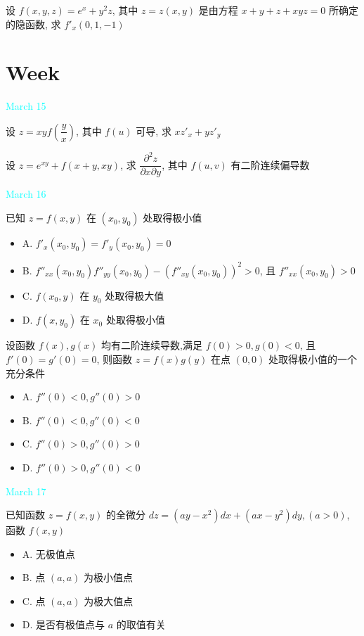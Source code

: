 \begin{example}[][Exam: 29.2.14]
	设 $f(x,y,z)=e^{x}+y^{2}z$, 其中 $z=z(x,y)$ 是由方程 $x+y+z+xyz=0$ 所确定的隐函数, 求 $f'_{x}(0,1,-1)$
\end{example}
\section{Week }
\textcolor{cyan}{March 15}

\begin{example}[][Exam: 29.3.1]
	设 $z=xyf(\dfrac{y}{x})$, 其中 $f(u)$ 可导, 求 $xz'_{x}+yz'_{y}$
\end{example}

\begin{example}[][Exam: 29.3.2]
	设 $z=e^{xy}+f(x+y,xy)$, 求 $\dfrac{\partial^{2} z}{\partial x\partial y}$, 其中 $f(u,v)$ 有二阶连续偏导数
\end{example}

\textcolor{cyan}{March 16}

\begin{example}[][Exam: 29.3.3]
	已知 $z=f(x,y)$ 在 $(x_{0},y_{0})$ 处取得极小值
\begin{itemize}
	\item A. $f'_{x}(x_{0},y_{0})=f'_{y}(x_{0},y_{0})=0$
	\item B. $f''_{xx}(x_{0},y_{0})f''_{yy}(x_{0},y_{0})-(f''_{xy}(x_{0},y_{0}))^{2}>0$, 且 $f''_{xx}(x_{0},y_{0})>0$
	\item C. $f(x_{0},y)$ 在 $y_{0}$ 处取得极大值
	\item D. $f(x,y_{0})$ 在 $x_{0}$ 处取得极小值
\end{itemize}
\end{example}

\begin{example}[][Exam: 29.3.4]
	设函数 $f(x),g(x)$ 均有二阶连续导数,满足 $f(0)>0,g(0)<0$, 且 $f'(0)=g'(0)=0$, 
	则函数 $z=f(x)g(y)$ 在点 $(0,0)$ 处取得极小值的一个充分条件
\begin{itemize}
	\item A. $f''(0)<0,g''(0)>0$
	\item B. $f''(0)<0,g''(0)<0$
	\item C. $f''(0)>0,g''(0)>0$
	\item D. $f''(0)>0,g''(0)<0$
\end{itemize}
\end{example}

\textcolor{cyan}{March 17}

\begin{example}[][Exam: 29.3.5]
	已知函数 $z=f(x,y)$ 的全微分 $dz=(ay-x^{2})dx+(ax-y^{2})dy,(a>0)$, 函数 $f(x,y)$
\begin{itemize}
	\item A. 无极值点
	\item B. 点 $(a,a)$ 为极小值点
	\item C. 点 $(a,a)$ 为极大值点
	\item D. 是否有极值点与 $a$ 的取值有关
\end{itemize}
\end{example}

